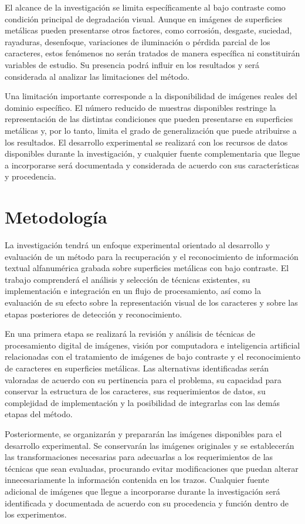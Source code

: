 El alcance de la investigación se limita específicamente al bajo contraste como condición principal de degradación visual. Aunque en imágenes de superficies metálicas pueden presentarse otros factores, como corrosión, desgaste, suciedad, rayaduras, desenfoque, variaciones de iluminación o pérdida parcial de los caracteres, estos fenómenos no serán tratados de manera específica ni constituirán variables de estudio. Su presencia podrá influir en los resultados y será considerada al analizar las limitaciones del método.

Una limitación importante corresponde a la disponibilidad de imágenes reales del dominio específico. El número reducido de muestras disponibles restringe la representación de las distintas condiciones que pueden presentarse en superficies metálicas y, por lo tanto, limita el grado de generalización que puede atribuirse a los resultados. El desarrollo experimental se realizará con los recursos de datos disponibles durante la investigación, y cualquier fuente complementaria que llegue a incorporarse será documentada y considerada de acuerdo con sus características y procedencia.

\section{Metodología}
\label{sec:metodologia}

La investigación tendrá un enfoque experimental orientado al desarrollo y evaluación de un método para la recuperación y el reconocimiento de información textual alfanumérica grabada sobre superficies metálicas con bajo contraste. El trabajo comprenderá el análisis y selección de técnicas existentes, su implementación e integración en un flujo de procesamiento, así como la evaluación de su efecto sobre la representación visual de los caracteres y sobre las etapas posteriores de detección y reconocimiento.

En una primera etapa se realizará la revisión y análisis de técnicas de procesamiento digital de imágenes, visión por computadora e inteligencia artificial relacionadas con el tratamiento de imágenes de bajo contraste y el reconocimiento de caracteres en superficies metálicas. Las alternativas identificadas serán valoradas de acuerdo con su pertinencia para el problema, su capacidad para conservar la estructura de los caracteres, sus requerimientos de datos, su complejidad de implementación y la posibilidad de integrarlas con las demás etapas del método.

Posteriormente, se organizarán y prepararán las imágenes disponibles para el desarrollo experimental. Se conservarán las imágenes originales y se establecerán las transformaciones necesarias para adecuarlas a los requerimientos de las técnicas que sean evaluadas, procurando evitar modificaciones que puedan alterar innecesariamente la información contenida en los trazos. Cualquier fuente adicional de imágenes que llegue a incorporarse durante la investigación será identificada y documentada de acuerdo con su procedencia y función dentro de los experimentos.

